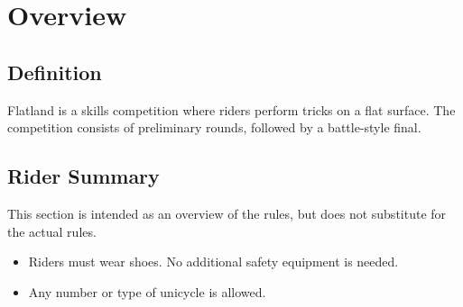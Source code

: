 \chapter{Overview}

\section{Definition}

Flatland is a skills competition where riders perform tricks on a flat surface. 
The competition consists of preliminary rounds, followed by a battle-style final. 

\section{Rider Summary}

This section is intended as an overview of the rules, but does not
substitute for the actual rules.
\begin{itemize}
\item Riders must wear shoes. No additional safety equipment is needed.
\item Any number or type of unicycle is allowed.
\end{itemize}